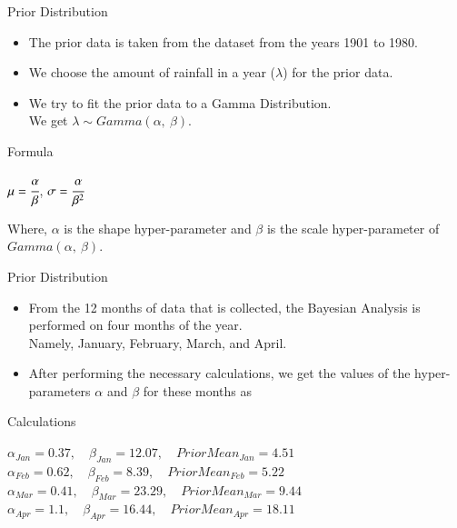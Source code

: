 \documentclass{beamer}
\begin{document}
\begin{frame}{Prior Distribution}
    \begin{itemize}
        \item The prior data is taken from the dataset from the years 1901 to 1980.
        \item We choose the amount of rainfall in a year ($\lambda$) for the prior data.
        \item We try to fit the prior data to a Gamma Distribution. \\
        We get $\lambda \sim Gamma(\alpha, \:\beta)$.
    \end{itemize}
    \begin{block}{Formula}
        \begin{center}
            $\mu = \cfrac{\alpha}{\beta}$\:, \quad
            $\sigma = \cfrac{\alpha}{\beta^2}$
        \end{center}
        Where, $\alpha$ is the shape hyper-parameter and $\beta$ is the scale hyper-parameter of $Gamma(\alpha, \:\beta).$
    \end{block}
\end{frame}

\begin{frame}{Prior Distribution}
    \begin{itemize}
        \item From the 12 months of data that is collected, the Bayesian Analysis is performed on four months of the year. \\Namely, January, February, March, and April.
        \item After performing the necessary calculations, we get the values of the hyper-parameters $\alpha$ and $\beta$ for these months as
    \end{itemize}
    \begin{block}{Calculations}
        \begin{center}
            $\alpha_{Jan} = 0.37, \quad\beta_{Jan} = 12.07, \quad PriorMean_{Jan} =  4.51$ \\
            $\alpha_{Feb} = 0.62, \quad\beta_{Feb} = 8.39, \quad PriorMean_{Feb} =  5.22$ \\
            $\alpha_{Mar} = 0.41, \quad\beta_{Mar} = 23.29, \quad PriorMean_{Mar} =  9.44$ \\
            $\alpha_{Apr} = 1.1, \quad\beta_{Apr} = 16.44, \quad PriorMean_{Apr} =  18.11$ \\
        \end{center}
    \end{block}
\end{frame}
\end{document}
